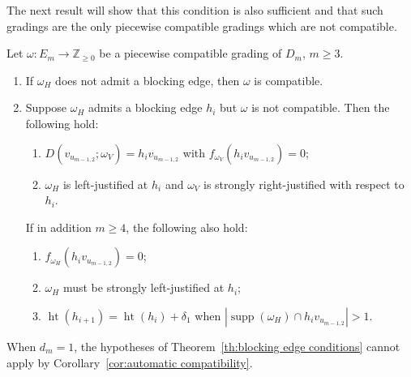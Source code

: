 \documentclass[ALCO,ThmDefs,Unicode,epreuves]{cedram}
\newcommand{\ZZ}{\mathbb{Z}}
\DeclareMathOperator{\hgt}{ht}
\DeclareMathOperator{\supp}{supp}
\begin{document}
The next result will show that this condition is also sufficient and that such gradings are the only piecewise compatible gradings which are not compatible.
\begin{theorem}
 \label{th:blocking edge conditions}
 Let $\omega:E_m\to\ZZ_{\ge0}$ be a piecewise compatible grading of $D_m$, $m\ge3$.
 \begin{enumerate}[label=(\alph*)]
 \item\label{theo3.20_1} If $\omega_H$ does not admit a blocking edge, then $\omega$ is compatible.
 \item\label{theo3.20_2} Suppose $\omega_H$ admits a blocking edge $h_i$ but $\omega$ is not compatible.
 Then the following hold:
 \begin{enumerate}[(\roman*)]
 \item\label{theo3.20_2_a} $D(v_{u_{m-1,2}};\omega_V)=h_iv_{u_{m-1,2}}$ with $f_{\omega_V}(h_iv_{u_{m-1,2}})=0$;
 \item\label{theo3.20_2_b} $\omega_H$ is left-justified at $h_i$ and $\omega_V$ is strongly right-justified with respect to $h_i$.
 \end{enumerate}
 If in addition $m\ge4$, the following also hold:
 \begin{enumerate}[(\roman*)]\addtocounter{enumii}{2}
 \item\label{theo3.20_2_c} $f_{\omega_H}(h_iv_{u_{m-1,2}})=0$;
 \item\label{theo3.20_2_d} $\omega_H$ must be strongly left-justified at $h_i$;
 \item\label{theo3.20_2_e} $\hgt(h_{i+1})=\hgt(h_i)+\delta_1$ when $|\supp(\omega_H)\cap h_iv_{u_{m-1,2}}|>1$.
 \end{enumerate}
 \end{enumerate}
\end{theorem}
\begin{remark}
 When $d_m=1$, the hypotheses of Theorem~\ref{th:blocking edge conditions} cannot apply by Corollary~\ref{cor:automatic compatibility}.
\end{remark}
\end{document}
